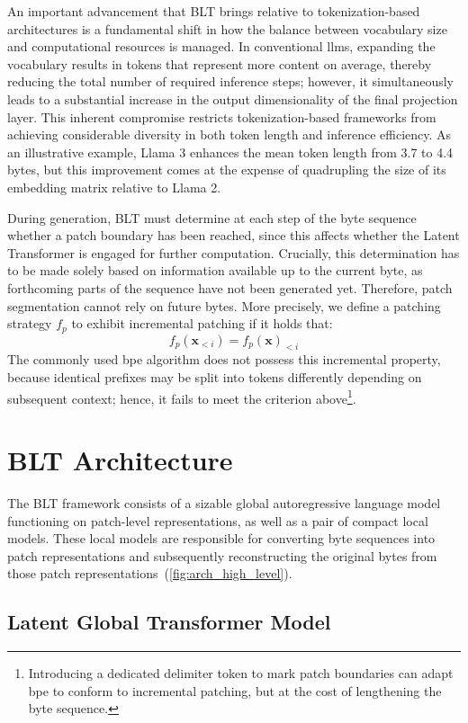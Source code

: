 An important advancement that {\textsc BLT} brings relative to tokenization-based architectures is a fundamental shift in how the balance between vocabulary size and computational resources is managed. In conventional llms, expanding the vocabulary results in tokens that represent more content on average, thereby reducing the total number of required inference steps; however, it simultaneously leads to a substantial increase in the output dimensionality of the final projection layer. This inherent compromise restricts tokenization-based frameworks from achieving considerable diversity in both token length and inference efficiency. As an illustrative example, Llama 3 enhances the mean token length from 3.7 to 4.4 bytes, but this improvement comes at the expense of quadrupling the size of its embedding matrix relative to Llama 2.

During generation, {\textsc BLT} must determine at each step of the byte sequence whether a patch boundary has been reached, since this affects whether the Latent Transformer is engaged for further computation. Crucially, this determination has to be made solely based on information available up to the current byte, as forthcoming parts of the sequence have not been generated yet. Therefore, patch segmentation cannot rely on future bytes. More precisely, we define a patching strategy $f_p$ to exhibit incremental patching if it holds that:
$$f_p(\pmb{x}_{<i}) = f_p(\pmb{x})_{<i}$$
The commonly used bpe algorithm does not possess this incremental property, because identical prefixes may be split into tokens differently depending on subsequent context; hence, it fails to meet the criterion above\footnote{Introducing a dedicated delimiter token to mark patch boundaries can adapt bpe to conform to incremental patching, but at the cost of lengthening the byte sequence.}.

\section{{\textsc BLT} Architecture}
\label{section:architecture}
The {\textsc BLT} framework consists of a sizable global autoregressive language model functioning on patch-level representations, as well as a pair of compact local models. These local models are responsible for converting byte sequences into patch representations and subsequently reconstructing the original bytes from those patch representations~(\autoref{fig:arch_high_level}).

\subsection{Latent Global Transformer Model}

